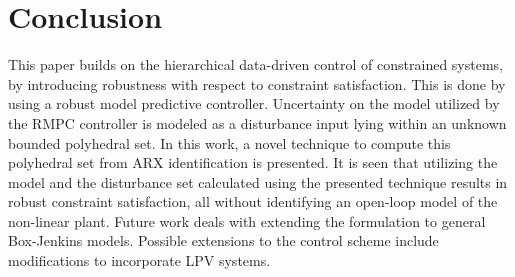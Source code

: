 \documentclass[letterpaper, 10 pt, conference]{ieeeconf}  %
\begin{document}
	\section{Conclusion}
	This paper builds on the hierarchical data-driven control of constrained systems, by introducing robustness with respect to constraint satisfaction. This is done by using a robust model predictive controller.  Uncertainty on the model utilized by the RMPC controller is modeled as a disturbance input lying within an unknown bounded polyhedral set. 
	In this work, a novel technique to compute this polyhedral set from ARX identification is presented. It is seen that utilizing the model and the disturbance set calculated using the presented technique results in robust constraint satisfaction, all without identifying an open-loop model of the non-linear plant. Future work deals with extending the formulation to general Box-Jenkins models. Possible extensions to the control scheme include modifications to incorporate LPV systems.

	
                                                             

\end{document}
